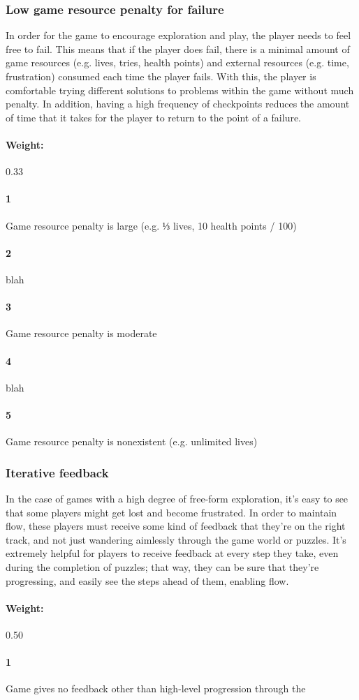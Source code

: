 \subsubsection{Low game resource penalty for failure}{In order for the game to encourage exploration and play, the player needs to feel free to fail. This means that if the player does fail, there is a minimal amount of game resources (e.g. lives, tries, health points) and external resources (e.g. time, frustration) consumed each time the player fails. With this, the player is comfortable trying different solutions to problems within the game without much penalty. In addition, having a high frequency of checkpoints reduces the amount of time that it takes for the player to return to the point of a failure.} \paragraph{Weight:}{0.33}\paragraph{1}Game resource penalty is large (e.g. ⅓ lives, 10 health points / 100)\paragraph{2}blah\paragraph{3}Game resource penalty is moderate\paragraph{4}blah\paragraph{5}Game resource penalty is nonexistent (e.g. unlimited lives)\subsubsection{Iterative feedback}{In the case of games with a high degree of free-form exploration, it's easy to see that some players might get lost and become frustrated. In order to maintain flow, these players must receive some kind of feedback that they're on the right track, and not just wandering aimlessly through the game world or puzzles. It's extremely helpful for players to receive feedback at every step they take, even during the completion of puzzles; that way, they can be sure that they're progressing, and easily see the steps ahead of them, enabling flow.} \paragraph{Weight:}{0.50}\paragraph{1}Game gives no feedback other than high-level progression through the 